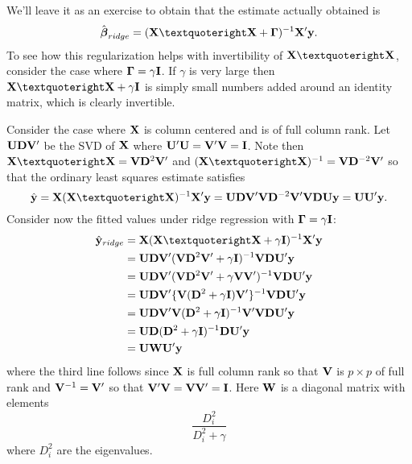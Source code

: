 We'll leave it as an exercise to obtain that the estimate actually obtained is
$$
\hat \bbeta_{ridge} = (\xtx + \bGamma)^{-1} \bX' \by.
$$
To see how this regularization helps with invertibility of $\xtx$, consider the case where
$\boldsymbol{\Gamma} = \gamma \mathbf{I}$. If $\gamma$ is very large then $\xtx + \gamma \bI$ is simply
small numbers added around an identity matrix, which is clearly invertible. 

Consider the case where $\mathbf{X}$ is column centered and is of full column rank. 
Let $\mathbf{U} \mathbf{D} \mathbf{V}'$ be the SVD of $\mathbf{X}$ where $\mathbf{U}' \mathbf{U} = \mathbf{V} ' \mathbf{V} = \mathbf{I}$. 
Note then $\xtx = \bV \bD^2 \bV'$ and $\xtxinv = \bV \bD^{-2} \bV'$ so that
the ordinary least squares estimate satisfies
$$
\hat \by = \bX \xtxinv \bX' \by = \bU \bD \bV' \bV \bD^{-2} \bV' \bV \bD \bU \by = \bU \bU' \by.
$$
Consider now the fitted values under ridge regression with $\boldsymbol{\Gamma} = \gamma \mathbf{I}$:
\begin{align*}
\hat \by_{ridge} 
& = \bX (\xtx + \gamma \bI)^{-1} \bX' \by \\
& = \bU \bD \bV' (\bV \bD^2 \bV' + \gamma \bI)^{-1} \bV \bD \bU' \by \\
& = \bU \bD \bV' (\bV \bD^2 \bV' + \gamma \bV \bV')^{-1} \bV \bD \bU' \by \\
& = \bU \bD \bV' \{\bV (\bD^2 + \gamma \bI) \bV'\}^{-1} \bV \bD \bU' \by \\
& = \bU \bD \bV' \bV (\bD^2 + \gamma \bI)^{-1} \bV' \bV \bD \bU' \by \\
& = \bU \bD (\bD^2 + \gamma \bI)^{-1} \bD \bU' \by\\
& = \bU \bW \bU' \by
\end{align*}
where the third line follows since $\mathbf{X}$ is full column rank so that $\mathbf{V}$ is $p\times p$ of full rank
and $\mathbf{V}^{-1} = \mathbf{V}'$ so that $\mathbf{V}' \mathbf{V} = \mathbf{V} \mathbf{V}' = \mathbf{I}$. Here $\mathbf{W}$ is a diagonal matrix with elements
$$
\frac{D_i^2}{D_i^2 + \gamma}
$$
where $D_i^2$ are the eigenvalues. 

